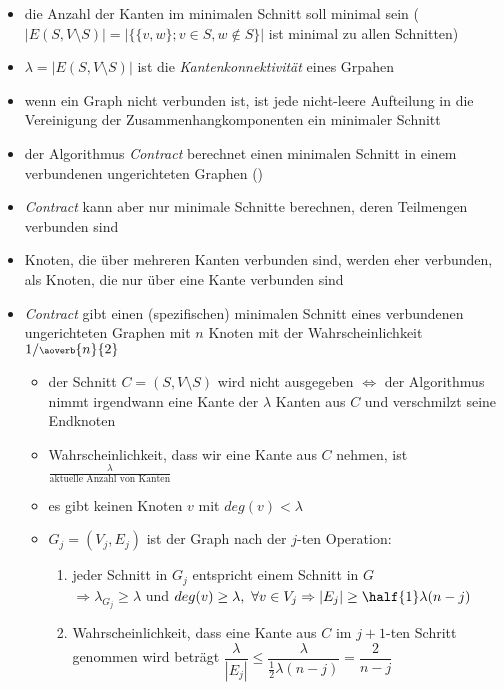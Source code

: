 \begin{itemize}[itemsep=-1pt]
	\item die Anzahl der Kanten im minimalen Schnitt soll minimal sein ($|E(S,V\setminus S)|=|\{\{v,w\};v\in S, w\notin S\}|$ ist minimal zu allen Schnitten)
	\item $\lambda = |E(S,V\setminus S)|$ ist die \textit{Kantenkonnektivität} eines Grpahen
	\item wenn ein Graph nicht verbunden ist, ist jede nicht-leere Aufteilung in die Vereinigung der Zusammenhangkomponenten ein minimaler Schnitt
	\item der Algorithmus \textit{Contract} berechnet einen minimalen Schnitt in einem verbundenen ungerichteten Graphen ()
	\item \textit{Contract} kann aber nur minimale Schnitte berechnen, deren Teilmengen verbunden sind
	\item Knoten, die über mehreren Kanten verbunden sind, werden eher verbunden, als Knoten, die nur über eine Kante verbunden sind
	\item \textit{Contract} gibt einen (spezifischen) minimalen Schnitt eines verbundenen ungerichteten Graphen mit $n$ Knoten mit der Wahrscheinlichkeit $1/\scriptsize{\aoverb{n}{2}}$
		\vspace*{-1.5\baselineskip}\Proof\up
			\begin{itemize}
				\item der Schnitt $C=(S,V\setminus S)$ wird nicht ausgegeben $\Longleftrightarrow$ der Algorithmus nimmt irgendwann eine Kante der $\lambda$ Kanten aus $C$ und verschmilzt seine Endknoten
				\item Wahrscheinlichkeit, dass wir eine Kante aus $C$ nehmen, ist $\frac{\lambda}{\text{aktuelle Anzahl von Kanten}}$
				\item es gibt keinen Knoten $v$ mit $deg(v)< \lambda$
				\item $G_j=(V_j,E_j)$ ist der Graph nach der $j$-ten Operation:
					\begin{enumerate}
						\item jeder Schnitt in $G_j$ entspricht einem Schnitt in $G$\\
						$\Rightarrow \lambda_{G_j} \geq \lambda$ und $deg(v)\geq \lambda,~\forall v\in V_j\\
						\Rightarrow |E_j| \geq \half{1}\lambda(n-j)$
						\item Wahrscheinlichkeit, dass eine Kante aus $C$ im $j+1$-ten Schritt genommen wird beträgt $\dfrac{\lambda}{|E_j|}\leq \dfrac{\lambda}{\frac{1}{2}\lambda(n-j)}=\dfrac{2}{n-j}$

\end{enumerate}
\end{itemize}
\end{itemize}
